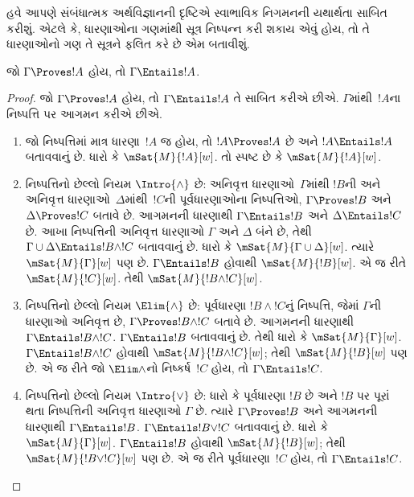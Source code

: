 હવે આપણે સંબંધાત્મક અર્થવિજ્ઞાનની દૃષ્ટિએ સ્વાભાવિક નિગમનની
યથાર્થતા સાબિત કરીશું. એટલે કે, ધારણાઓના ગણમાંથી
સૂત્ર નિષ્પન્ન કરી શકાય એવું હોય, તો તે ધારણાઓનો ગણ તે
સૂત્રને ફલિત કરે છે એમ બતાવીશું.

\begin{thm}[યથાર્થતા]
  જો $\Gamma \Proves !A$ હોય, તો $ \Gamma \Entails !A$.
\end{thm}

\begin{proof}
  જો $\Gamma \Proves !A$ હોય, તો $\Gamma \Entails !A$
  તે સાબિત કરીએ છીએ. $\Gamma$માંથી~$!A$ના
  નિષ્પત્તિ પર આગમન કરીએ છીએ.

  \begin{enumerate}
  \item જો નિષ્પત્તિમાં માત્ર ધારણા~$!A$ જ હોય,
    તો $!A \Proves !A$ છે અને $!A \Entails !A$
    બતાવવાનું છે. ધારો કે $\mSat{M}{!A}[w]$.
    તો સ્પષ્ટ છે કે $\mSat{M}{!A}[w]$.

  \item નિષ્પત્તિનો છેલ્લો નિયમ $\Intro{\land}$ છે:
    અનિવૃત્ત ધારણાઓ~$\Gamma$માંથી
      $!B$ની અને અનિવૃત્ત ધારણાઓ~$\Delta$માંથી~$!C$ની
      પૂર્વધારણાઓના નિષ્પત્તિઓ,
      $\Gamma \Proves !B$ અને $\Delta \Proves !C$ બતાવે છે.
      આગમનની ધારણાથી $\Gamma \Entails !B$ અને
      $\Delta \Entails !C$ છે. આખા નિષ્પત્તિની
      અનિવૃત્ત ધારણાઓ $\Gamma$ અને $\Delta$ બંને
      છે, તેથી $\Gamma \cup \Delta \Entails !B \land !C$
      બતાવવાનું છે.
      ધારો કે $\mSat{M}{\Gamma \cup \Delta}[w]$.
      ત્યારે $\mSat{M}{\Gamma}[w]$ પણ છે.
      $\Gamma \Entails !B$ હોવાથી $\mSat{M}{!B}[w]$.
      એ જ રીતે $\mSat{M}{!C}[w]$. તેથી
      $\mSat{M}{!B \land !C}[w]$.

  \item નિષ્પત્તિનો છેલ્લો નિયમ $\Elim{\land}$ છે:
    પૂર્વધારણા
      $!B \land !C$નું નિષ્પત્તિ, જેમાં $\Gamma$ની
      ધારણાઓ અનિવૃત્ત છે, $\Gamma \Proves !B \land !C$
      બતાવે છે. આગમનની ધારણાથી $\Gamma \Entails !B \land !C$.
      $\Gamma \Entails !B$ બતાવવાનું છે. તેથી ધારો કે
      $\mSat{M}{\Gamma}[w]$. $\Gamma \Entails !B \land !C$
      હોવાથી $\mSat{M}{!B \land !C}[w]$; તેથી
      $\mSat{M}{!B}[w]$ પણ છે. એ જ રીતે જો $\Elim\land$નો
      નિષ્કર્ષ~$!C$ હોય, તો $\Gamma \Entails !C$.

  \item નિષ્પત્તિનો છેલ્લો નિયમ $\Intro{\lor}$ છે:
    ધારો કે પૂર્વધારણા $!B$
      છે અને $!B$ પર પૂરાં થતા નિષ્પત્તિની
      અનિવૃત્ત ધારણાઓ $\Gamma$ છે. ત્યારે
      $\Gamma \Proves !B$ અને આગમનની ધારણાથી
      $\Gamma \Entails !B$. $\Gamma \Entails !B \lor !C$
      બતાવવાનું છે. ધારો કે $\mSat{M}{\Gamma}[w]$.
      $\Gamma \Entails !B$ હોવાથી $\mSat{M}{!B}[w]$;
      તેથી $\mSat{M}{!B \lor !C}[w]$ પણ છે. એ જ રીતે
      પૂર્વધારણા~$!C$ હોય, તો $\Gamma \Entails !C$.


\end{enumerate}
\end{proof}

